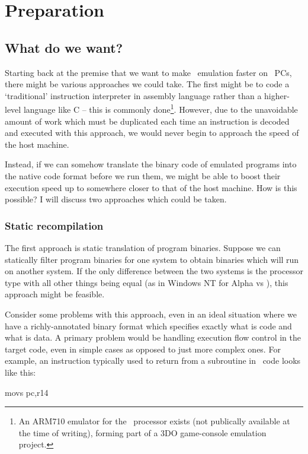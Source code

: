 \chapter{Preparation}

\section{What do we want?}

Starting back at the premise that we want to make \arm\ emulation faster on \ia\ PCs, there might be various approaches we could take. The first might be to code a `traditional' instruction interpreter in assembly language rather than a higher-level language like C -- this is commonly done\footnote{An ARM710 emulator for the \ia\ processor exists \cite{3DO} (not publically available at the time of writing), forming part of a 3DO game-console emulation project.}. However, due to the unavoidable amount of work which must be duplicated each time an instruction is decoded and executed with this approach, we would never begin to approach the speed of the host machine.

Instead, if we can somehow translate the binary code of emulated programs into the native code format before we run them, we might be able to boost their execution speed up to somewhere closer to that of the host machine. How is this possible? I will discuss two approaches which could be taken.

\subsection{Static recompilation}

The first approach is static translation of program binaries. Suppose we can statically filter program binaries for one system to obtain binaries which will run on another system. If the only difference between the two systems is the processor type with all other things being equal (as in Windows NT for Alpha vs \ia), this approach might be feasible.

Consider some problems with this approach, even in an ideal situation where we have a richly-annotated binary format which specifies exactly what is code and what is data. A primary problem would be handling execution flow control in the target code, even in simple cases as opposed to just more complex ones. For example, an instruction typically used to return from a subroutine in \arm\ code looks like this:

\begin{code}
movs pc,r14
\end{code}

